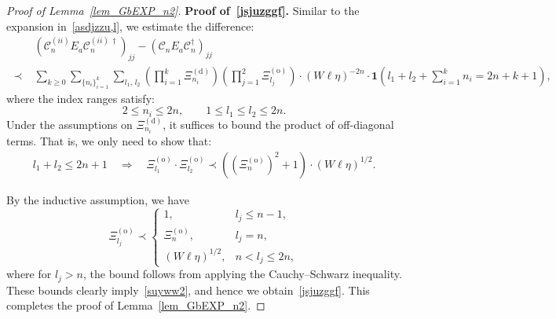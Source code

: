 \documentclass[10pt,reqno]{article}
\theoremstyle{plain} %
\theoremstyle{remark}
\numberwithin{equation}{section}
\begin{document}
\begin{proof}[Proof of Lemma~\ref{lem_GbEXP_n2}]
\bigskip
\bigskip
\noindent
\textbf{Proof of~\eqref{jsjuzggf}.} Similar to the expansion in~\eqref{asdjzzu,l}, we estimate the difference:
\begin{align}\label{asdjzzu,l2}
&\left( \mathcal{C}^{(ii)}_n E_a \mathcal{C}^{(ii)\, \dagger}_n \right)_{jj} 
- \left( \mathcal{C}_n E_a \mathcal{C}^\dagger_n \right)_{jj}
\\\nonumber
  \;\prec\; &  \sum_{k \ge 0} \sum_{\{n_i\}_{i=1}^k} \sum_{l_1,\, l_2}
\left( \prod_{i=1}^k \Xi^{(\mathrm{d})}_{n_i} \right)
\left( \prod_{j=1}^2 \Xi^{(\mathrm{o})}_{l_j} \right) \cdot (W \ell \eta)^{-2n}
\cdot \mathbf{1} \left( l_1 + l_2 + \sum_{i=1}^k n_i = 2n + k + 1 \right),
\end{align}
where the index ranges satisfy:
\[
2 \le n_i \le 2n, \qquad 1 \le l_1 \le l_2 \le 2n.
\]
Under the assumptions on \( \Xi^{(\mathrm{d})}_{n_i} \), it suffices to bound the product of off-diagonal terms. That is, we only need to show that:
\begin{align}\label{suyww2}
l_1 + l_2 \le 2n + 1 \quad \Longrightarrow \quad 
\Xi^{(\mathrm{o})}_{l_1} \cdot \Xi^{(\mathrm{o})}_{l_2} 
\prec \left( \left( \Xi^{(\mathrm{o})}_n \right)^2 + 1 \right) \cdot (W \ell \eta)^{1/2}.
\end{align}

\medskip

By the inductive assumption, we have 
\[
\Xi^{(\mathrm{o})}_{l_j} \prec
\begin{cases}
1, & l_j \le n - 1, \\[6pt]
\Xi^{(\mathrm{o})}_n, & l_j = n, \\[6pt]
(W \ell \eta)^{1/2}, & n < l_j \le 2n,
\end{cases}
\]
where for \( l_j > n \), the bound follows from applying the Cauchy–Schwarz inequality.
These bounds clearly imply~\eqref{suyww2}, and hence we obtain~\eqref{jsjuzggf}. This completes the proof of Lemma~\ref{lem_GbEXP_n2}.


 
 
\end{proof}
 



 
 
\printbibliography 
\end{document}

